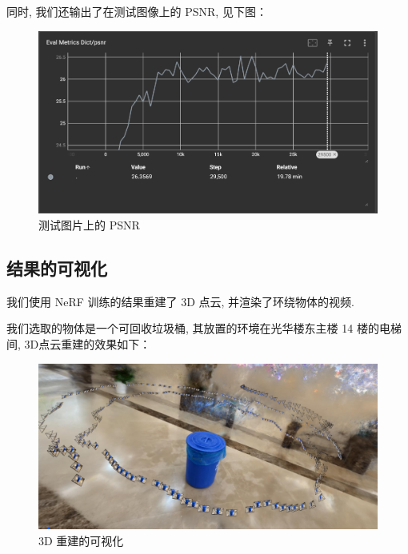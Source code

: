 \documentclass[notitlepage,cs4size,punct,oneside]{ctexrep}
\numberwithin{equation}{chapter}
\theoremstyle{mystyle}
\begin{document}
同时, 我们还输出了在测试图像上的 PSNR, 见下图：
\begin{figure}[H]
    \centering
    \includegraphics[width=1\linewidth]{psnr.png}
    \caption{测试图片上的 PSNR}
    \label{fig:enter-label}
\end{figure}

\subsection{结果的可视化}

我们使用 NeRF 训练的结果重建了 3D 点云, 并渲染了环绕物体的视频.

我们选取的物体是一个可回收垃圾桶, 其放置的环境在光华楼东主楼 14 楼的电梯间, 3D点云重建的效果如下：

\begin{figure}[H]
    \centering
    \includegraphics[width=1\linewidth]{3drecon.png}
    \caption{3D 重建的可视化}
    \label{fig:enter-label}
\end{figure}
\end{document}

